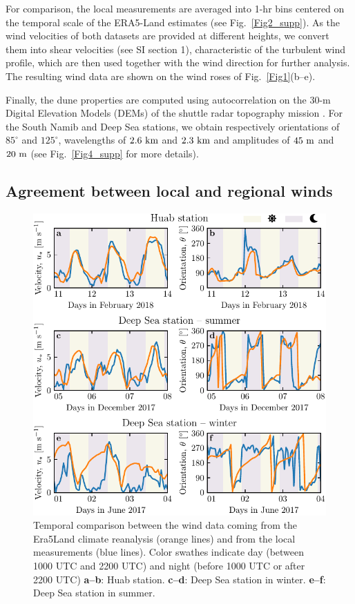   For comparison, the local measurements are averaged into 1-hr bins centered on the temporal scale of the ERA5-Land estimates (see Fig.~\ref{Fig2_supp}). As the wind velocities of both datasets are provided at different heights, we convert them into shear velocities (see SI section 1), characteristic of the turbulent wind profile, which are then used together with the wind direction for further analysis. The resulting wind data are shown on the wind roses of Fig.~\ref{Fig1}(b--e).

  Finally, the dune properties are computed using autocorrelation on the 30-m Digital Elevation Models (DEMs) of the shuttle radar topography mission \citep{Farr2007}. For the South Namib and Deep Sea stations, we obtain respectively orientations of $85^\circ$ and $125^\circ$, wavelengths of $2.6~\textup{km}$ and $2.3~\textup{km}$ and amplitudes of $45~\textup{m}$ and $20~\textup{m}$ (see Fig.~\ref{Fig4_supp} for more details).

  \subsection{Agreement between local and regional winds}

  \begin{figure}
    \centering
    \includegraphics[scale=1]{Figures/Figure2.pdf}
    \caption{Temporal comparison between the wind data coming from the Era5Land climate reanalysis (orange lines) and from the local measurements (blue lines). Color swathes indicate day (between 1000 UTC and 2200 UTC) and night (before 1000 UTC or after 2200 UTC) \textbf{a--b}: Huab station. \textbf{c--d}: Deep Sea station in winter. \textbf{e--f}: Deep Sea station in summer.}
    \label{Fig2}
  \end{figure}

